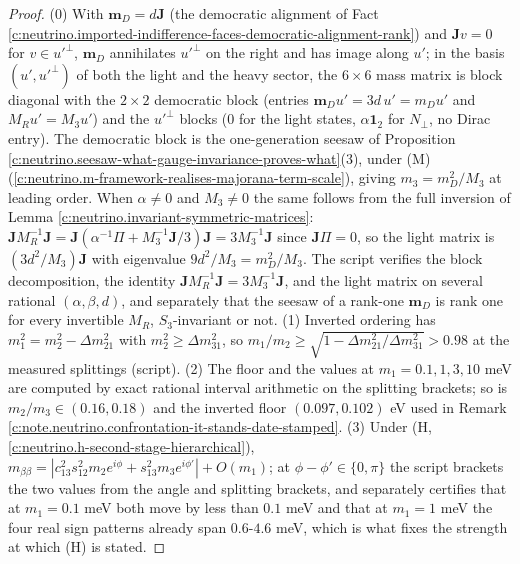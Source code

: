 \documentclass[11pt]{article}
\theoremstyle{definition}
\theoremstyle{plain}
\providecommand{\J}{}\renewcommand{\J}{\mathbf{J}}
\providecommand{\mD}{}\renewcommand{\mD}{\mathbf{m}_{D}}
\begin{document}
\begin{proof}
(0) With $\mD = d\J$ (the democratic alignment of Fact \ref{c:neutrino.imported-indifference-faces-democratic-alignment-rank}) and $\J v = 0$ for $v \in u'^{\perp}$, $\mD$ annihilates $u'^{\perp}$ on the right and has image along $u'$; in the basis $(u', u'^{\perp})$ of both the light and the heavy sector, the $6 \times 6$ mass matrix is block diagonal with the $2 \times 2$ democratic block (entries $\mD u' = 3d\,u' = m_{D}u'$ and $M_{R}u' = M_{3}u'$) and the $u'^{\perp}$ blocks ($0$ for the light states, $\alpha\mathbf{1}_{2}$ for $N_{\perp}$, no Dirac entry). The democratic block is the one-generation seesaw of Proposition \ref{c:neutrino.seesaw-what-gauge-invariance-proves-what}(3), under (M) (\ref{c:neutrino.m-framework-realises-majorana-term-scale}), giving $m_{3} = m_{D}^{2}/M_{3}$ at leading order. When $\alpha \neq 0$ and $M_{3} \neq 0$ the same follows from the full inversion of Lemma \ref{c:neutrino.invariant-symmetric-matrices}: $\J M_{R}^{-1}\J = \J(\alpha^{-1}\Pi + M_{3}^{-1}\J/3)\J = 3M_{3}^{-1}\J$ since $\J\Pi = 0$, so the light matrix is $(3d^{2}/M_{3})\J$ with eigenvalue $9d^{2}/M_{3} = m_{D}^{2}/M_{3}$. The script verifies the block decomposition, the identity $\J M_{R}^{-1}\J = 3M_{3}^{-1}\J$, and the light matrix on several rational $(\alpha, \beta, d)$, and separately that the seesaw of a rank-one $\mD$ is rank one for every invertible $M_{R}$, $S_{3}$-invariant or not. (1) Inverted ordering has $m_{1}^{2} = m_{2}^{2} - \Delta m^{2}_{21}$ with $m_{2}^{2} \ge \Delta m^{2}_{31}$, so $m_{1}/m_{2} \ge \sqrt{1 - \Delta m^{2}_{21}/\Delta m^{2}_{31}} > 0.98$ at the measured splittings (script). (2) The floor and the values at $m_{1} = 0.1, 1, 3, 10$ meV are computed by exact rational interval arithmetic on the splitting brackets; so is $m_{2}/m_{3} \in (0.16, 0.18)$ and the inverted floor $(0.097, 0.102)$ eV used in Remark \ref{c:note.neutrino.confrontation-it-stands-date-stamped}. (3) Under (H, \ref{c:neutrino.h-second-stage-hierarchical}), $m_{\beta\beta} = |c_{13}^{2}s_{12}^{2}m_{2}e^{i\phi} + s_{13}^{2}m_{3}e^{i\phi'}| + O(m_{1})$; at $\phi - \phi' \in \{0, \pi\}$ the script brackets the two values from the angle and splitting brackets, and separately certifies that at $m_{1} = 0.1$ meV both move by less than $0.1$ meV and that at $m_{1} = 1$ meV the four real sign patterns already span $0.6$-$4.6$ meV, which is what fixes the strength at which (H) is stated.

\end{proof}
\end{document}
